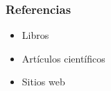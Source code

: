 \begin{frame}\transblindsvertical
	\frametitle{Referencias}
		\begin{itemize}
			\item Libros
			      \nocite{*}
			      \printbibliography[heading=none,keyword=book]
		\end{itemize}
		\begin{itemize}
			\item Artículos científicos
			      \printbibliography[heading=none,keyword=paper]
		\end{itemize}
		\begin{itemize}
			\item Sitios web
			      \printbibliography[heading=none,keyword=online]
		\end{itemize}
\end{frame}